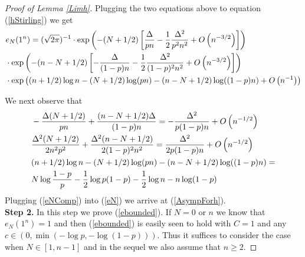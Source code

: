 \begin{proof}[Proof of Lemma \ref{Limh}]
Plugging the two equations above to equation (\ref{hStirling}) we get
\begin{equation}{\label{eN}}
\begin{split}
	& e_{N}(1^n)= (\sqrt{2\pi})^{-1}\cdot \exp\left(-(N+1/2)\left[\frac{\Delta}{pn}-\frac{1}{2}\frac{\Delta^2}{p^2 n^2}+O\left(n^{-3/2}\right)\right]\right)\\
	& \cdot \exp\left(-(n-N+1/2)\left[-\frac{\Delta}{(1-p)n}-\frac{1}{2}\frac{\Delta^2}{(1-p)^2 n^2}+O\left(n^{-3/2}\right)\right]\right)\\
	& \cdot \exp\left((n+1/2)\log n-(N+1/2)\log (pn)-(n-N+1/2)\log((1-p)n)+O\left(n^{-1}\right)\right)
\end{split}
\end{equation}

We next observe that 
\begin{equation}{\label{eNComp}}
	\begin{split}
		&-\frac{\Delta(N+1/2)}{pn}+\frac{(n-N+1/2)\Delta}{(1-p)n}=-\frac{\Delta^{2}}{p(1-p)n}+O\left(n^{-1/2}\right)\\
		 &\frac{\Delta^2(N+1/2)}{2n^2 p^2}+\frac{\Delta^2 (n-N+1/2)}{2(1-p)^2 n^2}=\frac{\Delta^2}{2p(1-p)n}+O\left(n^{-1/2}\right)\\
		&(n+1/2)\log n-(N+1/2)\log (pn)-(n-N+1/2)\log((1-p)n)=\\
		&N\log \frac{1-p}{p}-\frac{1}{2}\log p(1-p)-\frac{1}{2}\log n-n\log(1-p) 
	\end{split}
\end{equation}
Plugging (\ref{eNComp}) into (\ref{eN}) we arrive at (\ref{AsympForh}).\\
\textbf{Step 2.} In this step we prove (\ref{ebounded}). If $N=0$ or $n$ we know that $e_{N}(1^n)=1$ and then (\ref{ebounded}) is easily seen to hold with $C=1$ and any $c\in\left(0,\min(-\log p, -\log(1-p))\right)$. Thus it suffices to consider the case when $N\in[1,n-1]$ and in the sequel we also assume that $n\geq 2$.


\end{proof}
